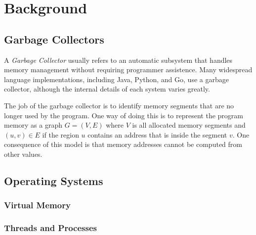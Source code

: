 \chapter{Background}

\section{Garbage Collectors}

A \emph{Garbage Collector} usually refers to an automatic subsystem that handles memory management
without requiring programmer assistence. Many widespread language implementations,
including Java, Python, and Go, use a garbage collector, although the internal details of each
system varies greatly.

The job of the garbage collector is to identify memory segments that are no longer used by the
program. One way of doing this is to represent the program memory as a graph $G=(V, E)$ where $V$ is
all allocated memory segments and $(u, v) \in E$ if the region $u$ contains an address that is
inside the segment $v$. One consequence of this model is that memory addresses cannot be computed
from other values.

\section{Operating Systems}

\todo{}

\subsection{Virtual Memory}

\todo{}

\subsection{Threads and Processes}

\todo{}
